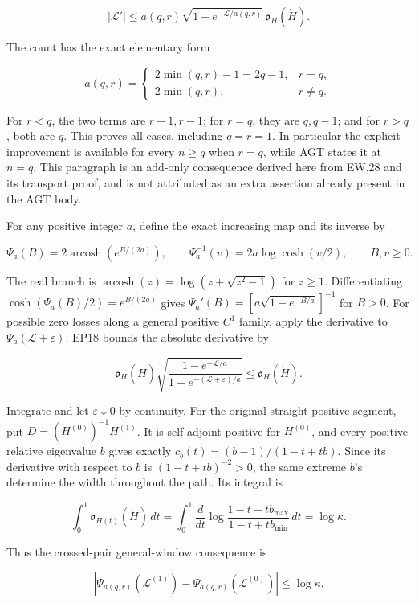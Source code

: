 \[
|\mathscr L'|\le a(q,r)\sqrt{1-e^{-\mathscr L/a(q,r)}}\,
\mathfrak o_H(\dot H).
\tag{EP18}
\]

The count has the exact elementary form

\[
a(q,r)=
\begin{cases}
2\min(q,r)-1=2q-1,&r=q,\\
2\min(q,r),&r\ne q.
\end{cases}
\tag{EP19}
\]

For \(r<q\), the two terms are \(r+1,r-1\); for \(r=q\), they are \(q,q-1\); and for \(r>q\), both are \(q\). This proves all cases, including \(q=r=1\). In particular the explicit improvement is available for every \(n\ge q\) when \(r=q\), while AGT states it at \(n=q\). This paragraph is an add-only consequence derived here from EW.28 and its transport proof, and is not attributed as an extra assertion already present in the AGT body.

For any positive integer \(a\), define the exact increasing map and its inverse by

\[
\Psi_a(B)=2\operatorname{arcosh}(e^{B/(2a)}),\qquad
\Psi_a^{-1}(v)=2a\log\cosh(v/2),\qquad B,v\ge0.
\tag{EP20}
\]

The real branch is \(\operatorname{arcosh}(z)=\log(z+\sqrt{z^2-1})\) for \(z\ge1\). Differentiating \(\cosh(\Psi_a(B)/2)=e^{B/(2a)}\) gives \(\Psi_a'(B)=[a\sqrt{1-e^{-B/a}}]^{-1}\) for \(B>0\). For possible zero losses along a general positive \(C^1\) family, apply the derivative to \(\Psi_a(\mathscr L+\varepsilon)\). EP18 bounds the absolute derivative by

\[
\mathfrak o_H(\dot H)
\sqrt{\frac{1-e^{-\mathscr L/a}}{1-e^{-(\mathscr L+\varepsilon)/a}}}
\le\mathfrak o_H(\dot H).
\tag{EP21}
\]

Integrate and let \(\varepsilon\downarrow0\) by continuity. For the original straight positive segment, put \(D=(H^{(0)})^{-1}H^{(1)}\). It is self-adjoint positive for \(H^{(0)}\), and every positive relative eigenvalue \(b\) gives exactly \(c_b(t)=(b-1)/(1-t+tb)\). Since its derivative with respect to \(b\) is \((1-t+tb)^{-2}>0\), the same extreme \(b\)'s determine the width throughout the path. Its integral is

\[
\int_0^1\mathfrak o_{H(t)}(\dot H)\,dt
=\int_0^1\frac{d}{dt}\log\frac{1-t+tb_{\max}}{1-t+tb_{\min}}\,dt
=\log\kappa.
\tag{EP22}
\]

Thus the crossed-pair general-window consequence is

\[
|\Psi_{a(q,r)}(\mathscr L^{(1)})-
  \Psi_{a(q,r)}(\mathscr L^{(0)})|\le\log\kappa.
\tag{EP23}
\]

